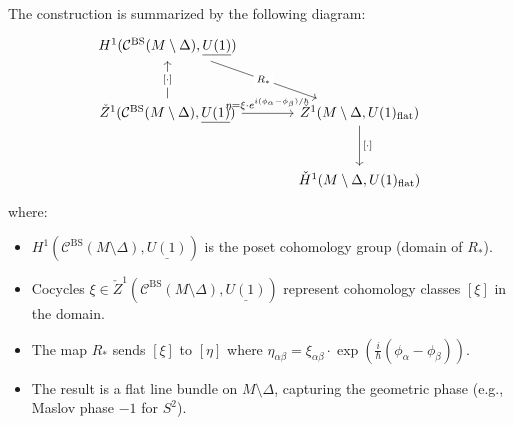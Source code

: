 \documentclass[11pt]{article}
\begin{document}
The construction is summarized by the following diagram:
\[
\begin{tikzcd}[column sep=large, row sep=large]
  H^1(\mathcal{C}^{\mathrm{BS}}(M \setminus \Delta), \underline{U(1)})
    \arrow[dr, "R_*" description] \\
  \check{Z}^1(\mathcal{C}^{\mathrm{BS}}(M \setminus \Delta), \underline{U(1)})
    \arrow[u, "{[\cdot]}" description]
    \arrow[r, "{\eta = \xi \cdot e^{i(\phi_\alpha - \phi_\beta)/\hbar}}"]
  & \check{Z}^1(M \setminus \Delta, U(1)_{\mathrm{flat}})
    \arrow[d, "{[\cdot]}"] \\
  & \check{H}^1(M \setminus \Delta, U(1)_{\mathrm{flat}})
\end{tikzcd}
\]
where:
\begin{itemize}
  \item $H^1(\mathcal{C}^{\mathrm{BS}}(M \setminus \Delta), \underline{U(1)})$ is the
        poset cohomology group (domain of $R_*$).
  \item Cocycles $\xi \in \check{Z}^1(\mathcal{C}^{\mathrm{BS}}(M \setminus \Delta), \underline{U(1)})$
        represent cohomology classes $[\xi]$ in the domain.
  \item The map $R_*$ sends $[\xi]$ to $[\eta]$ where
        $\eta_{\alpha\beta} = \xi_{\alpha\beta} \cdot \exp(\frac{i}{\hbar}(\phi_\alpha - \phi_\beta))$.
  \item The result is a flat line bundle on $M \setminus \Delta$,
        capturing the geometric phase (e.g., Maslov phase $-1$ for $S^2$).
\end{itemize}
\end{document}
